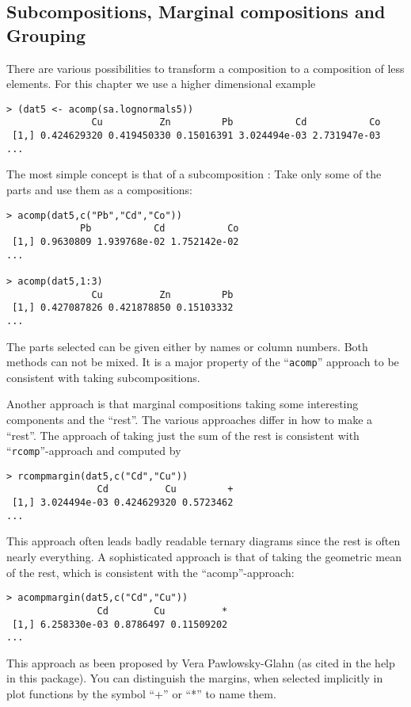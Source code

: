 \documentclass{article}
\newcommand{\code}[1]{{\tt #1}}
\begin{document}
\subsection{Subcompositions, Marginal compositions and Grouping}
There are various possibilities to transform a composition to a composition of
less elements. For this chapter we use a higher dimensional example
\begin{verbatim}
> (dat5 <- acomp(sa.lognormals5))
               Cu          Zn         Pb           Cd           Co
 [1,] 0.424629320 0.419450330 0.15016391 3.024494e-03 2.731947e-03
...
\end{verbatim}
The most simple concept is that of a subcomposition
\cite{Ait86}: Take only some of the parts and use them as a compositions: 
\begin{verbatim}
> acomp(dat5,c("Pb","Cd","Co"))
             Pb           Cd           Co
 [1,] 0.9630809 1.939768e-02 1.752142e-02
...

> acomp(dat5,1:3)
               Cu          Zn         Pb
 [1,] 0.427087826 0.421878850 0.15103332
...
\end{verbatim}
The parts selected can be given either by names or column numbers. Both
methods can not be mixed. It is a major property of the ``\code{acomp}''
approach to be consistent with taking subcompositions.
\par
Another approach is that marginal compositions taking some interesting
components and the ``rest''. The various approaches differ in how to make a
``rest''. The approach of taking just the sum of the rest is consistent with
``\code{rcomp}''-approach and computed by
\begin{verbatim}
> rcompmargin(dat5,c("Cd","Cu"))
                Cd          Cu         +
 [1,] 3.024494e-03 0.424629320 0.5723462
...
\end{verbatim}
This approach often leads badly readable ternary diagrams since the rest is
often nearly everything. A sophisticated approach is that of taking the
geometric mean of the rest, which is consistent with the ``acomp''-approach:
\begin{verbatim}
> acompmargin(dat5,c("Cd","Cu"))
                Cd        Cu          *
 [1,] 6.258330e-03 0.8786497 0.11509202
...
\end{verbatim}
This approach as been proposed by Vera Pawlowsky-Glahn (as cited in the help
in this package).  You can distinguish the margins, when selected implicitly
in plot functions by the symbol ``+'' or ``*'' to name them.
\par
\end{document}

